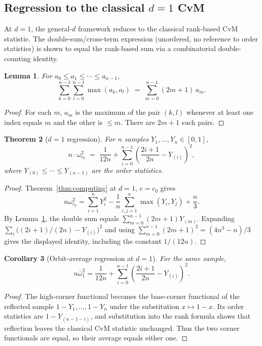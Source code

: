 \documentclass[pdflatex]{sn-jnl}
\theoremstyle{thmstyleone}
\newtheorem{theorem}{Theorem}[section]
\newtheorem{lemma}[theorem]{Lemma}
\newtheorem{corollary}[theorem]{Corollary}
\theoremstyle{thmstyletwo}
\theoremstyle{thmstylethree}
\begin{document}
\subsection{Regression to the classical \texorpdfstring{$d=1$}{d=1} CvM}\label{sec:d1-regression}

At $d=1$, the general-$d$ framework reduces to the classical rank-based CvM statistic. The double-sum/cross-term expression (unordered, no reference to order statistics) is shown to equal the rank-based sum via a combinatorial double-counting identity.

\begin{lemma}\label{lem:double-count}
For $a_0\le a_1\le\cdots\le a_{n-1}$,
\[
  \sum_{k=0}^{n-1}\sum_{l=0}^{n-1}\max(a_k,a_l) \;=\; \sum_{m=0}^{n-1}(2m+1)\,a_m.
\]
\end{lemma}

\begin{proof}
For each $m$, $a_m$ is the maximum of the pair $(k,l)$ whenever at least one index equals $m$ and the other is $\le m$. There are $2m+1$ such pairs.
\end{proof}

\begin{theorem}[$d=1$ regression]\label{thm:d1-regression}
For $n$ samples $Y_1,\dots,Y_n\in[0,1]$,
\[
  n\cdot\omega^2_{c_0} \;=\; \frac{1}{12n} + \sum_{i=0}^{n-1}\left(\frac{2i+1}{2n} - Y_{(i)}\right)^2,
\]
where $Y_{(0)}\le\cdots\le Y_{(n-1)}$ are the order statistics.
\end{theorem}

\begin{proof}
Theorem~\ref{thm:computing} at $d=1$, $c=c_0$ gives
\[
  n\omega^2_{c_0}
  =\sum_{i=1}^nY_i^2-\frac1n\sum_{i,j=1}^n\max(Y_i,Y_j)+\frac n3.
\]
By Lemma~\ref{lem:double-count}, the double sum equals
$\sum_{m=0}^{n-1}(2m+1)Y_{(m)}$. Expanding
$\sum_i\bigl((2i+1)/(2n)-Y_{(i)}\bigr)^2$ and using
$\sum_{m=0}^{n-1}(2m+1)^2=(4n^3-n)/3$ gives the displayed identity, including the constant $1/(12n)$.
\end{proof}

\begin{corollary}[Orbit-average regression at $d=1$]\label{cor:d1-orbit}
For the same sample,
\[
  n\bar\omega^2_1
  = \frac{1}{12n} + \sum_{i=0}^{n-1}\left(\frac{2i+1}{2n}-Y_{(i)}\right)^2.
\]
\end{corollary}

\begin{proof}
The high-corner functional becomes the base-corner functional of the reflected sample $1-Y_1,\dots,1-Y_n$ under the substitution $x\mapsto1-x$. Its order statistics are $1-Y_{(n-1-i)}$, and substitution into the rank formula shows that reflection leaves the classical CvM statistic unchanged. Thus the two corner functionals are equal, so their average equals either one.
\end{proof}
\end{document}
